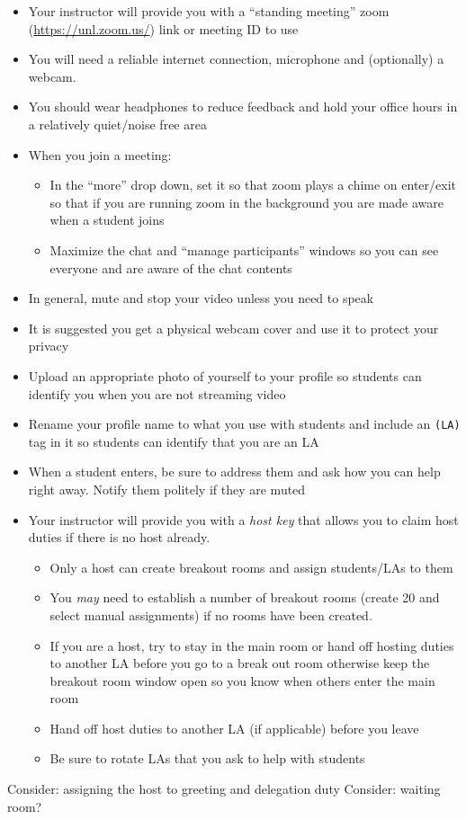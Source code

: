 \documentclass[12pt]{scrartcl}
\begin{document}
\begin{itemize}
  \item Your instructor will provide you with a ``standing meeting'' 
  zoom (\url{https://unl.zoom.us/}) link or meeting ID to use 
  \item You will need a reliable internet connection, microphone and 
  (optionally) a webcam.
  \item You should wear headphones to reduce feedback and hold your 
  office hours in a relatively quiet/noise free area
  \item When you join a meeting:
  \begin{itemize} 
    \item In the ``more'' drop down, set it so that zoom plays a chime on 
    enter/exit so that if you are running zoom in the background you are 
    made aware when a student joins
    \item Maximize the chat and ``manage participants'' windows so you can 
    see everyone and are aware of the chat contents
  \end{itemize}
  \item In general, mute and stop your video unless you need to speak
  \item It is suggested you get a physical webcam cover and use it to protect your privacy
  \item Upload an appropriate photo of yourself to your profile so students can identify you when you are not streaming video
  \item Rename your profile name to what you use with students and include an \texttt{(LA)} tag in it so students can identify that you are an LA 

  \item When a student enters, be sure to address them and ask how you can help right away.  Notify them politely if they are muted
  \item Your instructor will provide you with a \emph{host key} that allows you to claim host duties if there is no host already.
  \begin{itemize}
    \item Only a host can create breakout rooms and assign students/LAs to them
    \item You \emph{may} need to establish a number of breakout rooms (create 20 and select manual assignments) if no rooms have been created.
    \item If you are a host, try to stay in the main room or hand off hosting duties to another LA before you go to a break out room otherwise keep the breakout room window open so you know when others enter the main room
    \item Hand off host duties to another LA (if applicable) before you leave
    \item Be sure to rotate LAs that you ask to help with students
  \end{itemize}
\end{itemize}

Consider: assigning the host to greeting and delegation duty
Consider: waiting room?
\end{document}
